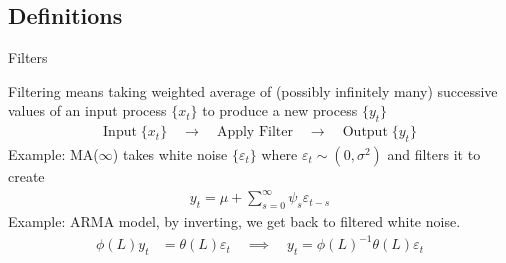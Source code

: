 \documentclass[aspectratio=169, handout]{beamer}
\newcommand{\ra}{\rightarrow}
\begin{document}










\subsection{Definitions}


{\footnotesize
\begin{frame}{Filters}

\alert{Filtering} means taking \alert{weighted average} of (possibly
infinitely many) successive values of an input process $\{x_t\}$ to
produce a new process $\{y_t\}$
\begin{align*}
  \text{Input}\; \{x_t\}
  \quad\ra\quad
  \text{Apply Filter}
  \quad\ra\quad
  \text{Output}\; \{y_t\}
\end{align*}
\pause
Example: MA($\infty$) takes white noise $\{\varepsilon_t\}$ where
$\varepsilon_t\sim (0,\sigma^2)$ and filters it to create
\begin{align*}
  y_t = \mu + \sum_{s=0}^\infty \psi_s \varepsilon_{t-s}
\end{align*}
\pause
Example: ARMA model, by inverting, we get back to filtered white noise.
\begin{align*}
  \phi(L)y_t &= \theta(L)\varepsilon_t
  \quad\implies\quad
  y_t = \phi(L)^{-1}\theta(L)\varepsilon_t
\end{align*}
\end{frame}
}
\end{document}
